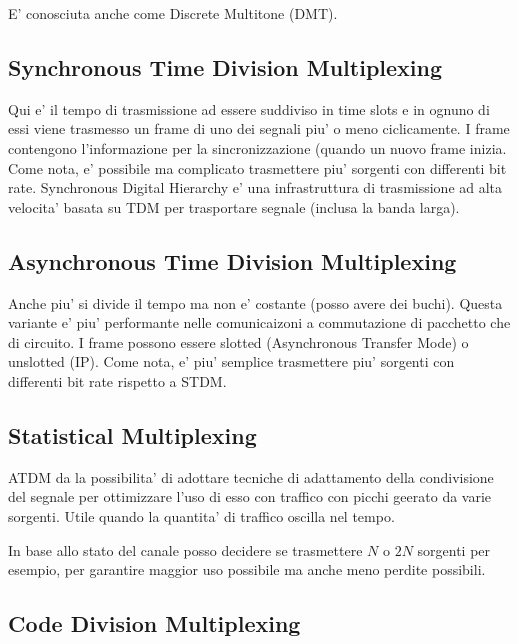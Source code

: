 E' conosciuta anche come Discrete Multitone (DMT).


\subsection{Synchronous Time Division Multiplexing}

Qui e' il tempo di trasmissione ad essere suddiviso in time slots e in ognuno di essi viene trasmesso un frame di uno dei segnali piu' o meno ciclicamente.
I frame contengono l'informazione per la sincronizzazione (quando un nuovo frame inizia.
Come nota, e' possibile ma complicato trasmettere piu' sorgenti con differenti bit rate.
Synchronous Digital Hierarchy e' una infrastruttura di trasmissione ad alta velocita' basata su TDM per trasportare segnale (inclusa la banda larga).


\subsection{Asynchronous Time Division Multiplexing}

Anche piu' si divide il tempo ma non e' costante (posso avere dei buchi).
Questa variante e' piu' performante nelle comunicaizoni a commutazione di pacchetto che di circuito.
I frame possono essere slotted (Asynchronous Transfer Mode) o unslotted (IP).
Come nota, e' piu' semplice trasmettere piu' sorgenti con differenti bit rate rispetto a STDM.


\subsection{Statistical Multiplexing}

ATDM da la possibilita' di adottare tecniche di adattamento della condivisione del segnale per ottimizzare l'uso di esso con traffico con picchi geerato da varie sorgenti.
Utile quando la quantita' di traffico oscilla nel tempo.

In base allo stato del canale posso decidere se trasmettere $N$ o $2N$ sorgenti per esempio, per garantire maggior uso possibile ma anche meno perdite possibili.


\subsection{Code Division Multiplexing}

